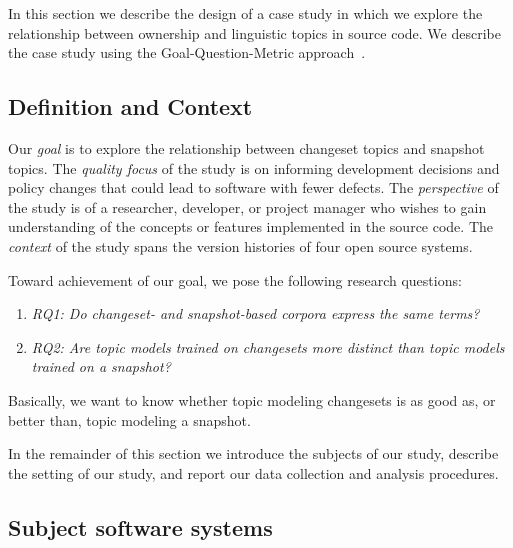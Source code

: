 
In this section we describe the design of a case study in which we
explore the relationship between ownership and linguistic topics in source code.
We describe the case study using the Goal-Question-Metric approach~\cite{Basili-etal:94}.

\subsection{Definition and Context}

Our \textit{goal} is to explore the relationship between changeset topics and snapshot topics.
The \textit{quality focus} of the study is on informing development decisions and policy changes
that could lead to software with fewer defects.
The \textit{perspective} of the study is of a researcher, developer, or project manager who wishes
to gain understanding of the concepts or features implemented in the source code.
The \textit{context} of the study spans the version histories of four open source systems.

Toward achievement of our goal, we pose the following research questions:
\begin{enumerate}
    \item[]\hspace*{-20pt}\textit{RQ1: Do changeset- and snapshot-based corpora express the same terms?}
    \item[]\hspace*{-20pt}\textit{RQ2: Are topic models trained on changesets more distinct than topic models trained on a snapshot?}
\end{enumerate}
Basically, we want to know whether topic modeling changesets is as good as, or better than, topic modeling a snapshot.

In the remainder of this section we introduce the subjects of our study,
describe the setting of our study, and report our data collection and analysis procedures.


\subsection{Subject software systems}

